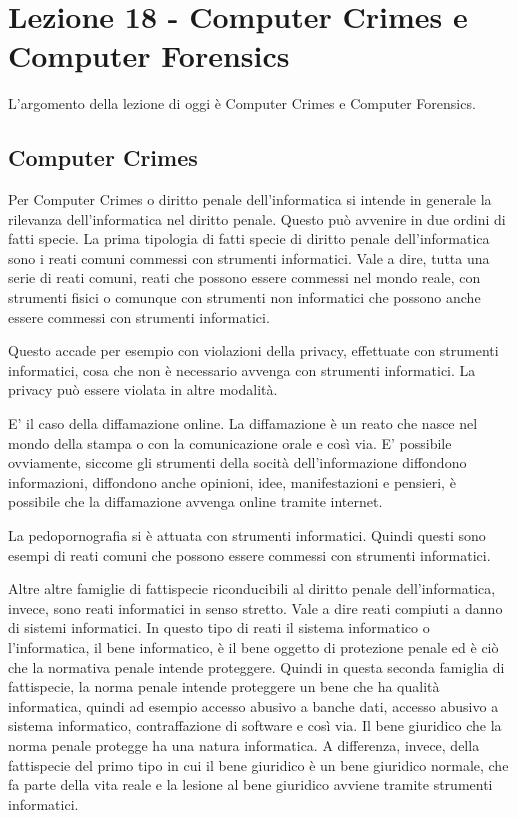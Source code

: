 \chapter{Lezione 18 - Computer Crimes e Computer Forensics}

L'argomento della lezione di oggi è Computer Crimes e Computer Forensics.

\section{Computer Crimes}
Per Computer Crimes o diritto penale dell'informatica si intende in generale la rilevanza dell'informatica nel diritto penale. Questo può avvenire in due ordini di fatti specie. La prima tipologia di fatti specie di diritto penale dell'informatica sono i reati comuni commessi con strumenti informatici. Vale a dire, tutta una serie di reati comuni, reati che possono essere commessi nel mondo reale, con strumenti fisici o comunque con strumenti non informatici che  possono anche essere commessi con strumenti informatici. 

Questo accade per esempio con violazioni della privacy, effettuate con strumenti informatici, cosa che non è necessario avvenga con strumenti informatici. La privacy può essere violata in altre modalità. 

E' il caso della diffamazione online. La diffamazione è un reato che nasce nel mondo della stampa o con la comunicazione orale e così via. E' possibile ovviamente, siccome gli strumenti della socità dell'informazione diffondono informazioni, diffondono anche opinioni, idee, manifestazioni e pensieri, è possibile che la diffamazione avvenga online tramite internet.

La pedopornografia si è attuata con strumenti informatici. 
Quindi questi sono esempi di reati comuni che possono essere commessi con strumenti informatici. 

Altre altre famiglie di fattispecie riconducibili al diritto penale dell'informatica, invece, sono reati informatici in senso stretto. Vale a dire reati compiuti a danno di sistemi informatici. In questo tipo di reati il sistema informatico o l'informatica, il bene informatico, è il bene oggetto di protezione penale ed è ciò che la normativa penale intende proteggere.
Quindi in questa seconda famiglia di fattispecie, la norma penale intende proteggere un bene che ha qualità informatica, quindi ad esempio accesso abusivo a banche dati, accesso abusivo a sistema informatico, contraffazione di software e così via. Il bene giuridico che la norma penale protegge ha una natura informatica. A differenza, invece, della fattispecie del primo tipo in cui il bene giuridico è un bene giuridico normale, che fa parte della vita reale e la lesione al bene giuridico avviene tramite strumenti informatici. 


